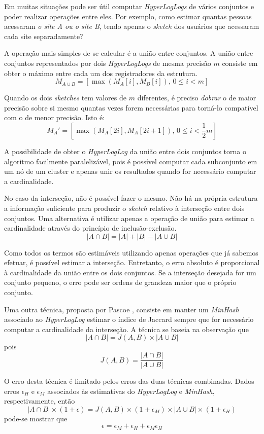 Em muitas situações pode ser útil computar \emph{HyperLogLogs} de vários conjuntos e poder realizar operações entre eles. Por exemplo, como estimar quantas pessoas acessaram \emph{o site A ou o site B}, tendo apenas o \emph{sketch} dos usuários que acessaram cada site separadamente?

A operação mais simples de se calcular é a união entre conjuntos. A união entre conjuntos representados por dois \emph{HyperLogLogs} de mesma precisão $m$ consiste em obter o máximo entre cada um dos registradores da estrutura.
\[
M_{A \cup B} = [\max(M_A[i], M_B[i]) \text{, } 0 \leq i < m]
\]

Quando os dois \emph{sketches} tem valores de $m$ diferentes, é preciso \emph{dobrar} o de maior precisão sobre si mesmo quantas vezes forem necessárias para torná-lo compatível com o de menor precisão. Isto é:
\[
M_{A}' = [\max(M_A[2i], M_A[2i+1]) \text{, } 0 \leq i < \frac{1}{2}m]
\]

A possibilidade de obter o \emph{HyperLogLog} da união entre dois conjuntos torna o algoritmo facilmente paralelizável, pois é possível computar cada subconjunto em um nó de um cluster e apenas unir os resultados quando for necessário computar a cardinalidade.

No caso da interseção, não é possível fazer o mesmo. Não há na própria estrutura a informação suficiente para produzir o \emph{sketch} relativo à interseção entre dois conjuntos. Uma alternativa é utilizar apenas a operação de união para estimar a cardinalidade através do princípio de inclusão-exclusão.
\[
|A \cap B| = |A| + |B| - |A \cup B|
\]

Como todos os termos são estimáveis utilizando apenas operações que já sabemos efetuar, é possível estimar a interseção. Entretanto, o erro absoluto é proporcional à cardinalidade da união entre os dois conjuntos. Se a interseção desejada for um conjunto pequeno, o erro pode ser ordens de grandeza maior que o próprio conjunto.

Uma outra técnica, proposta por Pascoe \cite{pascoe2013hllminhash}, consiste em manter um \emph{MinHash} associado ao \emph{HyperLogLog} estimar o índice de Jaccard sempre que for necessário computar a cardinalidade da interseção. A técnica se baseia na observação que
\[
|A \cap B| = J(A, B) \times |A \cup B|
\]
pois
\[
J(A, B) = \frac{|A \cap B|}{|A \cup B|}
\]

O erro desta técnica é limitado pelos erros das duas técnicas combinadas. Dados erros $\epsilon_{H}$ e $\epsilon_{M}$ associados às estimativas do \emph{HyperLogLog} e \emph{MinHash}, respectivamente, então
\[
|A \cap B| \times (1 + \epsilon) = J(A, B) \times (1 + \epsilon_M) \times |A \cup B|  \times (1 + \epsilon_H)
\]
pode-se mostrar que
\[
\epsilon = \epsilon_M + \epsilon_H + \epsilon_M\epsilon_H
\]

